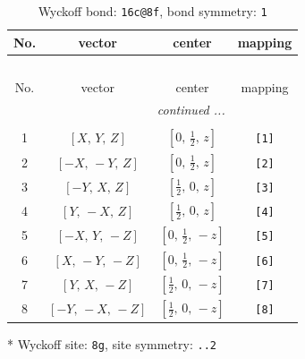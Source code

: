 \documentclass[fleqn,8pt]{jsarticle}
\begin{document}
\renewcommand{\arraystretch}{1.2}
\begin{longtable}{cccc}
\caption{Wyckoff bond: {\tt 16c@8f}, bond symmetry: {\tt 1}}
 \\
 \hline \hline
No. & vector & center & mapping \\ \hline \endfirsthead

\multicolumn{3}{l}{\tablename\ \thetable{}} \\
 \hline \hline
No. & vector & center & mapping \\ \hline \endhead

 \hline \hline
\multicolumn{3}{r}{\footnotesize\it continued ...} \\ \endfoot

 \hline \hline
\multicolumn{3}{r}{} \\ \endlastfoot

1 & $\left[ X,\, Y,\, Z \right]$ & $\left[ 0,\, \frac{1}{2},\, z \right]$ & {\tt [1]} \\ \hline
2 & $\left[ - X,\, - Y,\, Z \right]$ & $\left[ 0,\, \frac{1}{2},\, z \right]$ & {\tt [2]} \\ \hline
3 & $\left[ - Y,\, X,\, Z \right]$ & $\left[ \frac{1}{2},\, 0,\, z \right]$ & {\tt [3]} \\ \hline
4 & $\left[ Y,\, - X,\, Z \right]$ & $\left[ \frac{1}{2},\, 0,\, z \right]$ & {\tt [4]} \\ \hline
5 & $\left[ - X,\, Y,\, - Z \right]$ & $\left[ 0,\, \frac{1}{2},\, - z \right]$ & {\tt [5]} \\ \hline
6 & $\left[ X,\, - Y,\, - Z \right]$ & $\left[ 0,\, \frac{1}{2},\, - z \right]$ & {\tt [6]} \\ \hline
7 & $\left[ Y,\, X,\, - Z \right]$ & $\left[ \frac{1}{2},\, 0,\, - z \right]$ & {\tt [7]} \\ \hline
8 & $\left[ - Y,\, - X,\, - Z \right]$ & $\left[ \frac{1}{2},\, 0,\, - z \right]$ & {\tt [8]} \\
\end{longtable}
* Wyckoff site: {\tt 8g}, site symmetry: {\tt ..2}
\renewcommand{\arraystretch}{1.2}
\end{document}
